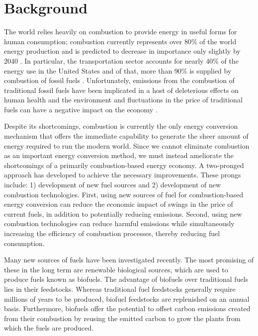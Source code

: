 \documentclass[../main.tex]{subfiles}
\begin{document}
\label{sec:intro-introduction}

\section{Background}

The world relies heavily on combustion to provide energy in useful forms for
human consumption; combustion currently represents over 80\% of the world
energy production \cite{Sims2007} and is predicted to decrease in importance
only slightly by 2040 \cite{EIA2013}. In particular, the transportation sector
accounts for nearly 40\% of the energy use in the United States and of that,
more than 90\% is supplied by combustion of fossil fuels \cite{MER2013}.
Unfortunately, emissions from the combustion of traditional fossil fuels have
been implicated in a host of deleterious effects on human health and the
environment \cite{Avakian2002} and fluctuations in the price of traditional
fuels can have a negative impact on the economy \cite{Owen2010}.

Despite its shortcomings, combustion is currently the only energy conversion
mechanism that offers the immediate capability to generate the sheer amount
of energy required to run the modern world. Since we cannot eliminate
combustion as an important energy conversion method, we must instead ameliorate
the shortcomings of a primarily combustion-based energy economy. A two-pronged
approach has developed to achieve the necessary improvements. These prongs
include: 1) development of new fuel sources and 2) development of new
combustion technologies. First, using new sources of fuel for combustion-based
energy conversion can reduce the economic impact of swings in the price of
current fuels, in addition to potentially reducing emissions. Second, using new
combustion technologies can reduce harmful emissions while simultaneously
increasing the efficiency of combustion processes, thereby reducing fuel
consumption.

Many new sources of fuels have been investigated recently. The most promising
of these in the long term are renewable biological sources, which are used to
produce fuels known as biofuels. The advantage of biofuels over traditional
fuels lies in their feedstocks. Whereas traditional fuel feedstocks generally
require millions of years to be produced, biofuel feedstocks are replenished
on an annual basis. Furthermore, biofuels offer the potential to offset carbon
emissions created from their combustion by reusing the emitted carbon to grow
the plants from which the fuels are produced.
\end{document}
